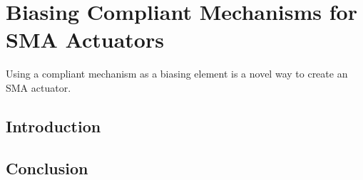 
\chapter{Biasing Compliant Mechanisms for SMA Actuators}
Using a compliant mechanism as a biasing element is a novel way to create an SMA actuator.
\section{Introduction}
\section{Conclusion}
